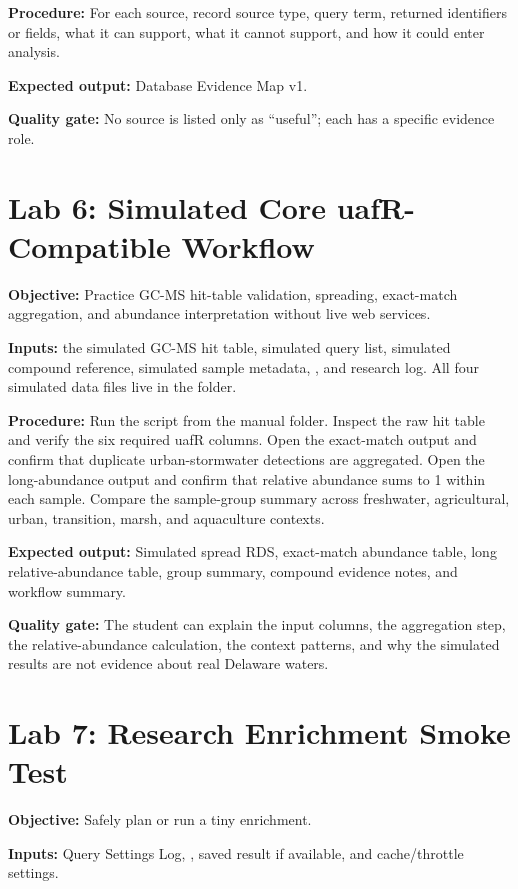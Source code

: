 \textbf{Procedure:} For each source, record source type, query term, returned identifiers or fields, what it can support, what it cannot support, and how it could enter analysis.

\textbf{Expected output:} Database Evidence Map v1.

\textbf{Quality gate:} No source is listed only as ``useful''; each has a specific evidence role.

\section{Lab 6: Simulated Core uafR-Compatible Workflow}
\textbf{Objective:} Practice GC-MS hit-table validation, spreading, exact-match aggregation, and abundance interpretation without live web services.

\textbf{Inputs:} the simulated GC-MS hit table, simulated query list, simulated compound reference, simulated sample metadata, , and research log. All four simulated data files live in the  folder.

\textbf{Procedure:} Run the script from the manual folder. Inspect the raw hit table and verify the six required uafR columns. Open the exact-match output and confirm that duplicate urban-stormwater  detections are aggregated. Open the long-abundance output and confirm that relative abundance sums to 1 within each sample. Compare the sample-group summary across freshwater, agricultural, urban, transition, marsh, and aquaculture contexts.

\textbf{Expected output:} Simulated spread RDS, exact-match abundance table, long relative-abundance table, group summary, compound evidence notes, and workflow summary.

\textbf{Quality gate:} The student can explain the input columns, the aggregation step, the relative-abundance calculation, the context patterns, and why the simulated results are not evidence about real Delaware waters.

\section{Lab 7: Research Enrichment Smoke Test}
\textbf{Objective:} Safely plan or run a tiny  enrichment.

\textbf{Inputs:} Query Settings Log, , saved result if available, and cache/throttle settings.

